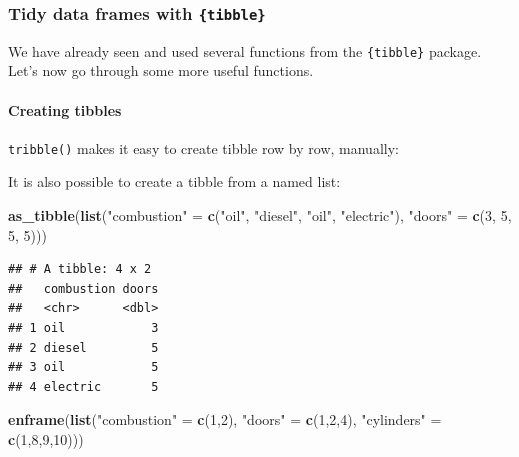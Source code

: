 \documentclass[]{gitbook}
\newenvironment{Shaded}{\begin{snugshade}}{\end{snugshade}}
\newcommand{\DecValTok}[1]{\textcolor[rgb]{0.00,0.00,0.81}{#1}}
\newcommand{\KeywordTok}[1]{\textcolor[rgb]{0.13,0.29,0.53}{\textbf{#1}}}
\newcommand{\NormalTok}[1]{#1}
\newcommand{\StringTok}[1]{\textcolor[rgb]{0.31,0.60,0.02}{#1}}
\let\oldparagraph\paragraph
\renewcommand{\paragraph}[1]{\oldparagraph{#1}\mbox{}}
\begin{document}
\hypertarget{tidy-data-frames-with-tibble}{%
\subsubsection{\texorpdfstring{Tidy data frames with \texttt{\{tibble\}}}{Tidy data frames with \{tibble\}}}\label{tidy-data-frames-with-tibble}}

We have already seen and used several functions from the \texttt{\{tibble\}} package. Let's now go through
some more useful functions.

\hypertarget{creating-tibbles}{%
\paragraph{Creating tibbles}\label{creating-tibbles}}

\texttt{tribble()} makes it easy to create tibble row by row, manually:

It is also possible to create a tibble from a named list:

\begin{Shaded}
\begin{Highlighting}[]
\KeywordTok{as_tibble}\NormalTok{(}\KeywordTok{list}\NormalTok{(}\StringTok{"combustion"}\NormalTok{ =}\StringTok{ }\KeywordTok{c}\NormalTok{(}\StringTok{"oil"}\NormalTok{, }\StringTok{"diesel"}\NormalTok{, }\StringTok{"oil"}\NormalTok{, }\StringTok{"electric"}\NormalTok{),}
               \StringTok{"doors"}\NormalTok{ =}\StringTok{ }\KeywordTok{c}\NormalTok{(}\DecValTok{3}\NormalTok{, }\DecValTok{5}\NormalTok{, }\DecValTok{5}\NormalTok{, }\DecValTok{5}\NormalTok{)))}
\end{Highlighting}
\end{Shaded}

\begin{verbatim}
## # A tibble: 4 x 2
##   combustion doors
##   <chr>      <dbl>
## 1 oil            3
## 2 diesel         5
## 3 oil            5
## 4 electric       5
\end{verbatim}

\begin{Shaded}
\begin{Highlighting}[]
\KeywordTok{enframe}\NormalTok{(}\KeywordTok{list}\NormalTok{(}\StringTok{"combustion"}\NormalTok{ =}\StringTok{ }\KeywordTok{c}\NormalTok{(}\DecValTok{1}\NormalTok{,}\DecValTok{2}\NormalTok{), }\StringTok{"doors"}\NormalTok{ =}\StringTok{ }\KeywordTok{c}\NormalTok{(}\DecValTok{1}\NormalTok{,}\DecValTok{2}\NormalTok{,}\DecValTok{4}\NormalTok{), }\StringTok{"cylinders"}\NormalTok{ =}\StringTok{ }\KeywordTok{c}\NormalTok{(}\DecValTok{1}\NormalTok{,}\DecValTok{8}\NormalTok{,}\DecValTok{9}\NormalTok{,}\DecValTok{10}\NormalTok{)))}
\end{Highlighting}
\end{Shaded}
\end{document}
